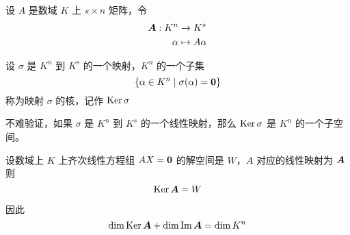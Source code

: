 设 $A$ 是数域 $K$ 上 $s \times n$ 矩阵，令
\[
	\begin{aligned}
		\boldsymbol{A} : K^n & \rightarrow K^s  \\
		\alpha        & \mapsto A\alpha
	\end{aligned}
\]


\begin{definition}
	设 $\sigma$ 是 $K^n$ 到 $K^s$ 的一个映射，$K^n$ 的一个子集
	\[ \{ \alpha \in K^n \mid \sigma(\alpha) = \boldsymbol{0} \} \]
	称为映射 $\sigma$ 的核，记作 $\operatorname{Ker} \sigma$
\end{definition}

不难验证，如果 $\sigma$ 是 $K^n$ 到 $K^s$ 的一个线性映射，那么 $\operatorname{Ker} \sigma$ 是 $K^n$ 的一个子空间。

\begin{theorem}
	设数域上 $K$ 上齐次线性方程组 $AX = \boldsymbol{0}$ 的解空间是 $W$，$A$ 对应的线性映射为 $\boldsymbol{A}$ 则
	\[ \operatorname{Ker} \boldsymbol{A} = W \]
\end{theorem}

因此
\[ \dim \operatorname{Ker} \boldsymbol{A} + \dim \operatorname{Im} \boldsymbol{A} = \dim K^n \]
